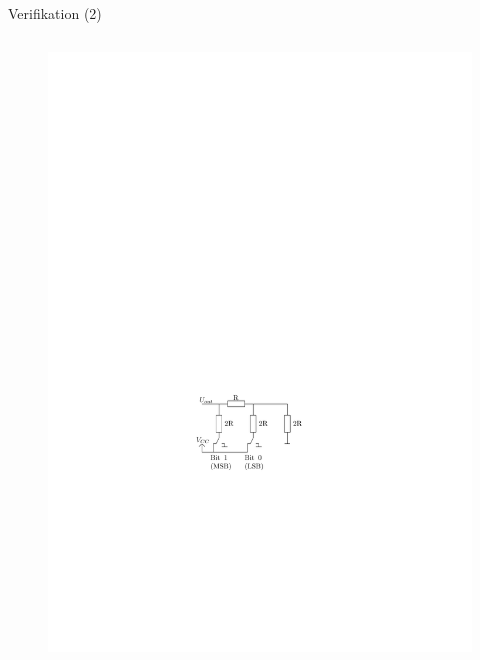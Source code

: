\documentclass{beamer}
\begin{document}
\begin{frame}{Verifikation (2)}
\begin{columns}
\begin{column}{0.4\textwidth}
\begin{figure}[htbp]
				\includegraphics[scale=0.6]{./images/arduinoio-r2r-network.pdf}
			\end{figure}
		\end{column}
	\end{columns}
\end{frame}
\end{document}
